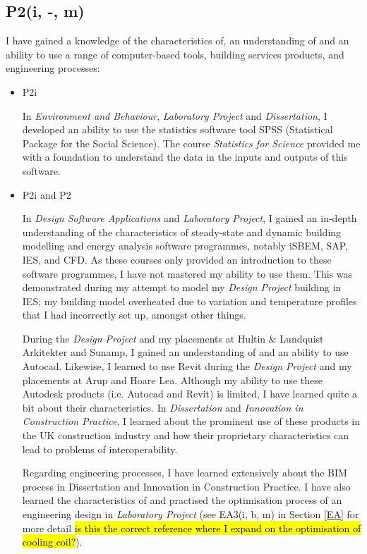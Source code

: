 \subsection*{P2(i, -, m)}

I have gained a knowledge of the characteristics of, an understanding of and an ability to use a range of computer-based tools, building services products, and engineering processes:
\begin{itemize}
    \item P2i 
     
     In \textit{Environment and Behaviour}, \textit{Laboratory Project} and \textit{Dissertation}, I developed an ability to use the statistics software tool SPSS (Statistical Package for the Social Science).
     The course \textit{Statistics for Science} provided me with a foundation to understand the data in the inputs and outputs of this software.
    
    \item P2i and P2
    
    In \textit{Design Software Applications} and \textit{Laboratory Project}, I gained an in-depth understanding of the characteristics of steady-state and dynamic building modelling and energy analysis software programmes, notably iSBEM, SAP, IES, and CFD.
    As these courses only provided an introduction to these software programmes, I have not mastered my ability to use them.
    This was demonstrated during my attempt to model my \textit{Design Project} building in IES; my building model overheated due to variation and temperature profiles that I had incorrectly set up, amongst other things.
    
    During the \textit{Design Project} and my placements at Hultin \& Lundquist Arkitekter and Sunamp, I gained an understanding of and an ability to use Autocad.
    Likewise, I learned to use Revit during the \textit{Design Project} and my placements at Arup and Hoare Lea.
    Although my ability to use these Autodesk products (i.e. Autocad and Revit) is limited, I have learned quite a bit about their characteristics.
    In \textit{Dissertation} and \textit{Innovation in Construction Practice}, I learned about the prominent use of these products in the UK construction industry and how their proprietary characteristics can lead to problems of interoperability.
    
    Regarding engineering processes, I have learned extensively about the BIM process in Dissertation and Innovation in Construction Practice.
    I have also learned the characteristics of and practised the optimisation process of an engineering design in \textit{Laboratory Project} (see EA3(i, b, m) in Section \ref{EA} for more detail \hl{is this the correct reference where I expand on the optimisation of cooling coil?}).
    

\end{itemize}
